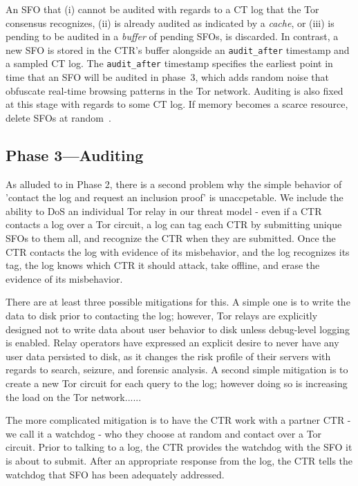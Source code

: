 An SFO that
    (i) cannot be audited with regards to a CT log that the Tor consensus
        recognizes,
    (ii) is already audited as indicated by a \emph{cache}, or
    (iii) is pending to be audited in a \emph{buffer} of pending SFOs,
is discarded.  In contrast, a new SFO is stored in the CTR's buffer
alongside an \texttt{audit\_after} timestamp and a sampled CT log.  The
\texttt{audit\_after} timestamp specifies the earliest point in time that an SFO
will be audited in phase~3, which adds random noise that obfuscate real-time
browsing patterns in the Tor network.  Auditing is also fixed at this stage with
regards to some CT log.  If memory becomes a scarce resource, delete SFOs at
random~\cite{nordberg}.



\subsection{Phase 3---Auditing} \label{sec:base:phase3}

As alluded to in Phase 2, there is a second problem why the simple behavior of 'contact
the log and request an inclusion proof' is unaccpetable. We include the ability
to DoS an individual Tor relay in our threat model - even if a CTR contacts a log
over a Tor circuit, a log can tag each CTR by submitting unique SFOs to them all, and
recognize the CTR when they are submitted. Once the CTR contacts the log with evidence
of its misbehavior, and the log recognizes its tag, the log knows which CTR it should
attack, take offline, and erase the evidence of its misbehavior.

There are at least three possible mitigations for this. A simple one is to write
the data to disk prior to contacting the log; however, Tor relays are explicitly
designed not to write data about user behavior to disk unless debug-level logging
is enabled. Relay operators have expressed an explicit desire to never have any 
user data persisted to disk, as it changes the risk profile of their servers with
regards to search, seizure, and forensic analysis. A second simple mitigation is
to create a new Tor circuit for each query to the log; however doing so is increasing the load on the Tor network......

The more complicated mitigation is to have the CTR work with a partner CTR - we call it
a watchdog - who they choose at random and contact over a Tor circuit. Prior to talking
to a log, the CTR provides the watchdog with the SFO it is about to submit. After
an appropriate response from the log, the CTR tells the watchdog that SFO has been
adequately addressed.  

